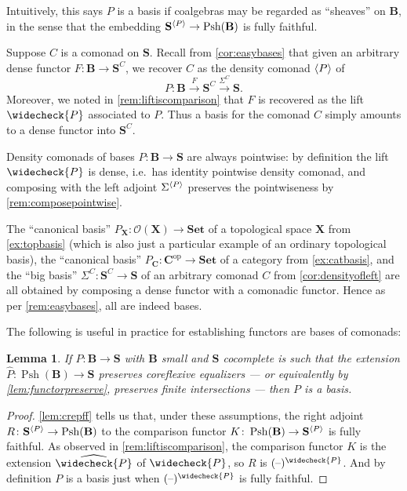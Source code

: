 \documentclass[11pt, oneside, article]{memoir}
\theoremstyle{plain}
\newtheorem{lemma}[theorem]{Lemma}
\theoremstyle{definition}
\theoremstyle{remark}
\newenvironment{example}
{\renewcommand\qedsymbol{$\lrcorner$}%
  \pushQED{\qed}\myexample}
{\popQED\endmyexample}
\newenvironment{remark}
{\renewcommand\qedsymbol{$\lrcorner$}%
  \pushQED{\qed}\myremark}
{\popQED\endmyremark}
\DeclareMathOperator{\Psh}{Psh}
\DeclareMathOperator{\Lan}{Lan}
\DeclareMathOperator{\ophelper}{op}
\DeclarePairedDelimiter{\gen}{\langle}{\rangle}
\newcommand{\dash}{{\mathord{\text{--}}}}
\newcommand{\op}{^{\ophelper}}
\newcommand{\xto}[1]{\xrightarrow{#1}}
\newcommand{\namedcat}[1]{\mathbf{#1}}
\newcommand{\cat}[1]{\mathbf{#1}}
\newcommand{\spa}[1]{\mathbf{#1}}
\newcommand{\Set}{\namedcat{Set}}
\newcommand{\CoalgOn}[2]{{#2}^{#1}}
\newcommand{\CoalgS}[1]{\CoalgOn{#1}{\bS}}
\newcommand{\lift}[1]{\widecheck{#1}}
\newcommand{\extend}[1]{\widehat{#1}}
\newcommand{\nerve}[1]{(\dash)^{#1}}
\newcommand{\bsheaf}[1]{\nerve{\lift{#1}}}
\newcommand{\carr}{\Sigma}
\newcommand{\car}[1]{\carr^{#1}}
\newcommand{\carC}{\car{\cC}}
\newcommand{\carP}{\car{\cP}}
\newcommand{\ph}[1]{#1}
\newcommand{\topbasis}[1]{\pP_{#1}}
\newcommand{\catbasis}[1]{\pP_{#1}}
\newcommand{\Ps}[1]{\Psh(#1)}
\newcommand{\cmnd}[1]{{#1}}
\newcommand{\cC}{\cmnd{C}}
\newcommand{\bB}{\cat{B}}
\newcommand{\bC}{\cat{C}}
\newcommand{\bS}{\cat{S}}
\newcommand{\pP}{\ph{P}}
\newcommand{\cP}{\gen{\pP}}
\newcommand{\lP}{\lift{\pP}}
\newcommand{\tX}{\spa{X}}
\newcommand{\CS}{\CoalgS{\cC}}
\newcommand{\PS}{\CoalgS{\cP}}
\newcommand{\La}[2]{\Lan_{#1}#2}
\newcommand{\opens}[1]{\mathcal{O}(#1)}
\begin{document}
Intuitively, this says $\pP$ is a basis if coalgebras may be regarded
as ``sheaves'' on $\bB$, in the sense that the embedding
$\PS \to \Ps{\bB}$ is fully faithful.

\begin{remark}\label{rem:easybases}
  Suppose $\cC$ is a comonad on $\bS$. Recall from
  \cref{cor:easybases} that given an arbitrary dense functor
  $F \colon \bB \to \CS$, we recover $\cC$ as the density comonad
  $\cP$ of \[\pP \colon \bB \xto{F} \CS \xto{\carC} \bS.\] Moreover,
  we noted in \cref{rem:liftiscomparison} that $F$ is recovered as
  the lift $\lP$ associated to $\pP$. Thus a basis for the comonad $\cC$
  simply amounts to a dense functor into $\CS$.
\end{remark}

\begin{remark}\label{rem:pointwisebasis}
  Density comonads of bases $\pP \colon \bB \to \bS$ are always
  pointwise: by definition the lift $\lP$ is dense, i.e.\ has identity
  pointwise density comonad, and composing with the left adjoint
  $\carP$ preserves the pointwiseness by \cref{rem:composepointwise}.
\end{remark}

\begin{example}[Canonical bases]\label{rem:indeedbases}
  The ``canonical basis'' $\topbasis{\tX} \colon \opens{\tX} \to \Set$
  of a topological space $\tX$ from \cref{ex:topbasis} (which is also
  just a particular example of an ordinary topological basis), the
  ``canonical basis'' $\catbasis{\bC} \colon \bC\op \to \Set$ of a
  category from \cref{ex:catbasis}, and the ``big basis''
  $\carC \colon \CS \to \bS$ of an arbitrary comonad $\cC$ from
  \cref{cor:densityofleft} are all obtained by composing a dense
  functor with a comonadic functor. Hence as per \cref{rem:easybases},
  all are indeed bases.
\end{example}

The following is useful in practice for establishing functors are
bases of comonads:

\begin{lemma}\label{lem:extcoref}
  If $\pP \colon \bB \to \bS$ with $\bB$ small and $\bS$ cocomplete is
  such that the extension $\extend{\pP} \colon \Ps{\bB} \to \bS$
  preserves coreflexive equalizers --- or equivalently by
  \cref{lem:functorpreserve}, preserves finite intersections --- then
  $\pP$ is a basis.
\end{lemma}
\begin{proof}
  \cref{lem:crepff} tells us that, under these assumptions, the right adjoint
  $R \colon \PS \to \Ps{\bB}$ to the comparison functor
  $K \colon \Ps{\bB} \to \PS$ is fully faithful. As observed in
  \cref{rem:liftiscomparison}, the comparison functor $K$ is the
  extension $\extend{\lP}$ of $\lP$, so $R$ is $\nerve{\lP}$. And by
  definition $\pP$ is a basis just when $\nerve{\lP}$ is fully
  faithful.
\end{proof}
\end{document}
